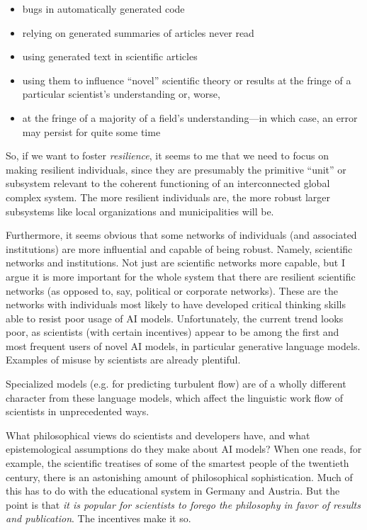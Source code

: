 \documentclass[11pt, oneside]{article}   	%
\begin{document}
\begin{itemize}
    \item bugs in automatically generated code
    \item relying on generated summaries of articles never read
    \item using generated text in scientific articles
    \item using them to influence ``novel'' scientific theory or results at the fringe of a particular scientist's understanding or, worse, 
    \item at the fringe of a majority of a field's understanding---in which case, an error may persist for quite some time
\end{itemize}

So, if we want to foster \emph{resilience}, it seems to me that we need to focus on making resilient individuals, since they are presumably the primitive  ``unit'' or subsystem relevant to the coherent functioning of an interconnected global complex system.  The more resilient individuals are, the more robust  larger subsystems like local organizations and municipalities will be.

Furthermore, it seems obvious that some networks of individuals (and associated institutions) are more influential and capable of being robust.  Namely, scientific networks and institutions.  Not just are scientific networks more capable, but I argue it is more important for the whole system that there are resilient scientific networks (as opposed to, say, political or corporate networks).  These are the networks with individuals most likely to have developed critical thinking skills able to resist poor usage of AI models.  Unfortunately, the current trend looks poor, as scientists (with certain incentives) appear to be among the first and most frequent users of novel AI models, in particular generative language models.  Examples of misuse by scientists are already plentiful.  

Specialized models (e.g. for predicting turbulent flow) are of a wholly different character from these language models, which affect the linguistic work flow of scientists in unprecedented ways.

What philosophical views do scientists and developers have, and what epistemological assumptions do they make about AI models?  When one reads, for example, the scientific treatises of some of the smartest people of the twentieth century, there is an astonishing amount of philosophical sophistication.  Much of this has to do with the educational system in Germany and Austria.  But the point is that \emph{it is popular for scientists to forego the philosophy in favor of results and publication}.  The incentives make it so.
\end{document}

